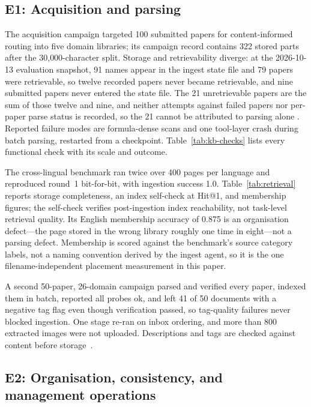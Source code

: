 \subsection{E1: Acquisition and parsing}
\label{sec:e1}

The acquisition campaign targeted 100 submitted papers for content-informed
routing into five domain libraries; its campaign record contains 322 stored
parts after the 30{,}000-character split. Storage and retrievability diverge:
at the 2026-10-13 evaluation snapshot, 91 names appear
in the ingest state file and 79 papers were retrievable, so twelve recorded
papers never became retrievable, and nine submitted papers never entered the
state file. The 21 unretrievable papers are the sum of those twelve and nine,
and neither attempts against failed papers nor per-paper parse status is
recorded, so the 21 cannot be attributed to parsing alone
\cite{missier-prov-2013}. Reported failure modes are formula-dense scans and
one tool-layer crash during batch parsing, restarted from a checkpoint.
Table~\ref{tab:kb-checks} lists every functional check with its scale and
outcome.

The cross-lingual benchmark ran twice over 400 pages per language and
reproduced round~1 bit-for-bit, with ingestion success 1.0. Table~\ref{tab:retrieval} reports
storage completeness, an index self-check at Hit@1, and membership figures;
the self-check verifies post-ingestion index reachability, not task-level
retrieval quality. Its English membership accuracy of 0.875 is an organisation
defect---the page stored in the wrong library roughly one time in eight---not
a parsing defect. Membership is scored against the benchmark's source category labels, not a
naming convention derived by the ingest agent, so it is the one
filename-independent placement measurement in this paper.

A second 50-paper, 26-domain campaign parsed and verified every paper, indexed
them in batch, reported all probes ok, and left 41 of 50 documents with a
negative tag flag even though verification passed, so tag-quality failures
never blocked ingestion.
One stage re-ran on inbox ordering, and more than 800 extracted images were
not uploaded. Descriptions and tags are checked against content before
storage~\cite{park-metadata-quality-2009}.


\subsection{E2: Organisation, consistency, and management operations}
\label{sec:e2}


